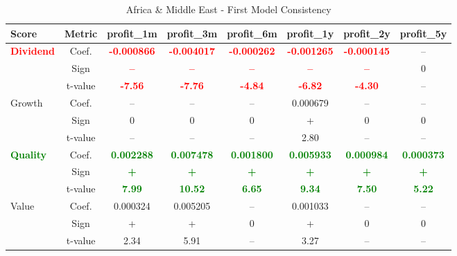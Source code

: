 \documentclass[11pt,english,a4paper,hidelinks]{book}
\begin{document}
\begin{table}[H]
    \centering
    \caption{Africa \& Middle East - First Model Consistency}
    \begin{tabular}{lccccccc}
        \toprule
        \textbf{Score} & \textbf{Metric} & \textbf{profit\_1m} & \textbf{profit\_3m} & \textbf{profit\_6m} & \textbf{profit\_1y} & \textbf{profit\_2y} & \textbf{profit\_5y} \\
        \midrule
        \multirow{3}{*}{\textbf{\textcolor{red}{Dividend}}} 
            & Coef. & \textbf{\textcolor{red}{-0.000866}} & \textbf{\textcolor{red}{-0.004017}} & \textbf{\textcolor{red}{-0.000262}} & \textbf{\textcolor{red}{-0.001265}} & \textbf{\textcolor{red}{-0.000145}} & -- \\
            & Sign & \textbf{\textcolor{red}{–}} & \textbf{\textcolor{red}{–}} & \textbf{\textcolor{red}{–}} & \textbf{\textcolor{red}{–}} & \textbf{\textcolor{red}{–}} & 0 \\
            & t-value & \textbf{\textcolor{red}{-7.56}} & \textbf{\textcolor{red}{-7.76}} & \textbf{\textcolor{red}{-4.84}} & \textbf{\textcolor{red}{-6.82}} & \textbf{\textcolor{red}{-4.30}} & -- \\
        \midrule
        \multirow{3}{*}{Growth} 
            & Coef. & -- & -- & -- & 0.000679 & -- & -- \\
            & Sign & 0 & 0 & 0 & + & 0 & 0 \\
            & t-value & -- & -- & -- & 2.80 & -- & -- \\
        \midrule
        \multirow{3}{*}{\textbf{\textcolor{green}{Quality}}} 
            & Coef. & \textbf{\textcolor{green}{0.002288}} & \textbf{\textcolor{green}{0.007478}} & \textbf{\textcolor{green}{0.001800}} & \textbf{\textcolor{green}{0.005933}} & \textbf{\textcolor{green}{0.000984}} & \textbf{\textcolor{green}{0.000373}} \\
            & Sign & \textbf{\textcolor{green}{+}} & \textbf{\textcolor{green}{+}} & \textbf{\textcolor{green}{+}} & \textbf{\textcolor{green}{+}} & \textbf{\textcolor{green}{+}} & \textbf{\textcolor{green}{+}} \\
            & t-value & \textbf{\textcolor{green}{7.99}} & \textbf{\textcolor{green}{10.52}} & \textbf{\textcolor{green}{6.65}} & \textbf{\textcolor{green}{9.34}} & \textbf{\textcolor{green}{7.50}} & \textbf{\textcolor{green}{5.22}} \\
        \midrule
        \multirow{3}{*}{Value} 
            & Coef. & 0.000324 & 0.005205 & -- & 0.001033 & -- & -- \\
            & Sign & + & + & 0 & + & 0 & 0 \\
            & t-value & 2.34 & 5.91 & -- & 3.27 & -- & -- \\
        \bottomrule
    \end{tabular}
    \label{tab:africa_first_model_consistency}
\end{table}
\end{document}
